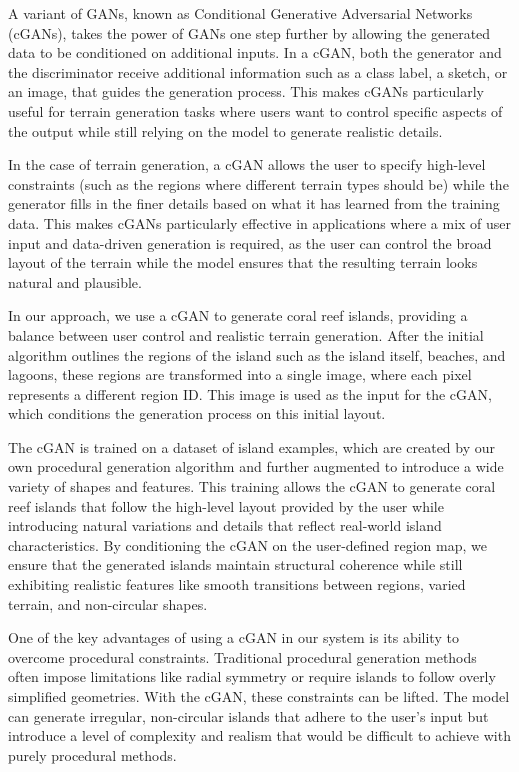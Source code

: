 A variant of GANs, known as Conditional Generative Adversarial Networks (cGANs), takes the power of GANs one step further by allowing the generated data to be conditioned on additional inputs. In a cGAN, both the generator and the discriminator receive additional information such as a class label, a sketch, or an image, that guides the generation process. This makes cGANs particularly useful for terrain generation tasks where users want to control specific aspects of the output while still relying on the model to generate realistic details.

In the case of terrain generation, a cGAN allows the user to specify high-level constraints (such as the regions where different terrain types should be) while the generator fills in the finer details based on what it has learned from the training data. This makes cGANs particularly effective in applications where a mix of user input and data-driven generation is required, as the user can control the broad layout of the terrain while the model ensures that the resulting terrain looks natural and plausible.

In our approach, we use a cGAN to generate coral reef islands, providing a balance between user control and realistic terrain generation. After the initial algorithm outlines the regions of the island such as the island itself, beaches, and lagoons, these regions are transformed into a single image, where each pixel represents a different region ID. This image is used as the input for the cGAN, which conditions the generation process on this initial layout.


The cGAN is trained on a dataset of island examples, which are created by our own procedural generation algorithm and further augmented to introduce a wide variety of shapes and features. This training allows the cGAN to generate coral reef islands that follow the high-level layout provided by the user while introducing natural variations and details that reflect real-world island characteristics. By conditioning the cGAN on the user-defined region map, we ensure that the generated islands maintain structural coherence while still exhibiting realistic features like smooth transitions between regions, varied terrain, and non-circular shapes.

One of the key advantages of using a cGAN in our system is its ability to overcome procedural constraints. Traditional procedural generation methods often impose limitations like radial symmetry or require islands to follow overly simplified geometries. With the cGAN, these constraints can be lifted. The model can generate irregular, non-circular islands that adhere to the user's input but introduce a level of complexity and realism that would be difficult to achieve with purely procedural methods.


